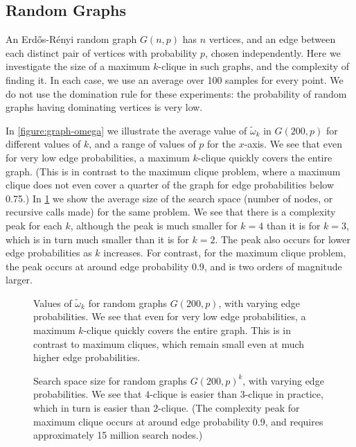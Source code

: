 \documentclass[letterpaper]{article}
\begin{document}
\subsection{Random Graphs}

An Erd\H{o}s-R\'{e}nyi random graph $G(n, p)$ has $n$ vertices, and an edge between each distinct
pair of vertices with probability $p$, chosen independently. Here we investigate the size of a
maximum $k$-clique in such graphs, and the complexity of finding it. In each case, we use an average
over 100 samples for every point.  We do not use the domination rule for these experiments: the
probability of random graphs having dominating vertices is very low.

In \cref{figure:graph-omega} we illustrate the average value of $\tilde{\omega}_k$ in $G(200,
p)$ for different values of $k$, and a range of values of $p$ for the $x$-axis. We see that even for
very low edge probabilities, a maximum $k$-clique quickly covers the entire graph.  (This is in contrast to
the maximum clique problem, where a maximum clique does not even cover a quarter of the graph for
edge probabilities below 0.75.) In \cref{figure:graph-nodes} we show the average size of the
search space (number of nodes, or recursive calls made) for the same problem. We see that there is a
complexity peak for each $k$, although the peak is much smaller for $k = 4$ than it is for $k = 3$,
which is in turn much smaller than it is for $k = 2$. The peak also occurs for lower edge
probabilities as $k$ increases. For contrast, for the maximum clique problem, the peak occurs at
around edge probability 0.9, and is two orders of magnitude larger.

\begin{figure}[p] %
    \centering
    \caption{Values of $\tilde{\omega}_k$ for random graphs $G(200, p)$, with varying edge probabilities.
        We see that even for very low edge probabilities, a
    maximum $k$-clique quickly covers the entire graph. This is in contrast to maximum cliques, which remain
    small even at much higher edge probabilities.}
    \label{figure:graph-omega}

    \vspace{1.5em}

    \caption{Search space size for random graphs $G(200, p)^k$, with varying edge probabilities. We see that
        $4$-clique is easier than $3$-clique in practice, which in turn is easier than $2$-clique. (The
        complexity peak for maximum clique occurs at around edge probability 0.9, and requires
        approximately 15 million search nodes.)}
    \label{figure:graph-nodes}
\end{figure}
\end{document}
